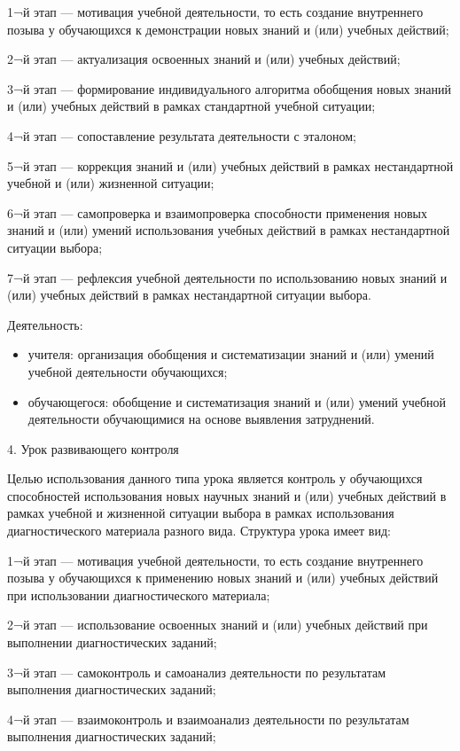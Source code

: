 \documentclass[
  11pt,
  russian,
]{book}
\begin{document}
1¬й этап --- мотивация учебной деятельности, то есть создание внутреннего позыва у обучающихся к демонстрации новых знаний и (или) учебных действий;

2¬й этап --- актуализация освоенных знаний и (или) учебных действий;

3¬й этап --- формирование индивидуального алгоритма обобщения новых знаний и (или) учебных действий в рамках стандартной учебной ситуации;

4¬й этап --- сопоставление результата деятельности с эталоном;

5¬й этап --- коррекция знаний и (или) учебных действий в рамках нестандартной учебной и (или) жизненной ситуации;

6¬й этап --- самопроверка и взаимопроверка способности применения новых знаний и (или) умений использования учебных действий в рамках нестандартной ситуации выбора;

7¬й этап --- рефлексия учебной деятельности по использованию новых знаний и (или) учебных действий в рамках нестандартной ситуации выбора.

Деятельность:

\begin{itemize}
\item
  учителя: организация обобщения и систематизации знаний и (или) умений учебной деятельности обучающихся;
\item
  обучающегося: обобщение и систематизация знаний и (или) умений учебной деятельности обучающимися на основе выявления затруднений.
\end{itemize}

4. Урок развивающего контроля

Целью использования данного типа урока является контроль у обучающихся способностей использования новых научных знаний и (или) учебных действий в рамках учебной и жизненной ситуации выбора в рамках использования диагностического материала разного вида. Структура урока имеет вид:

1¬й этап --- мотивация учебной деятельности, то есть создание внутреннего позыва у обучающихся к применению новых знаний и (или) учебных действий при использовании диагностического материала;

2¬й этап --- использование освоенных знаний и (или) учебных действий при выполнении диагностических заданий;

3¬й этап --- самоконтроль и самоанализ деятельности по результатам выполнения диагностических заданий;

4¬й этап --- взаимоконтроль и взаимоанализ деятельности по результатам выполнения диагностических заданий;
\end{document}

